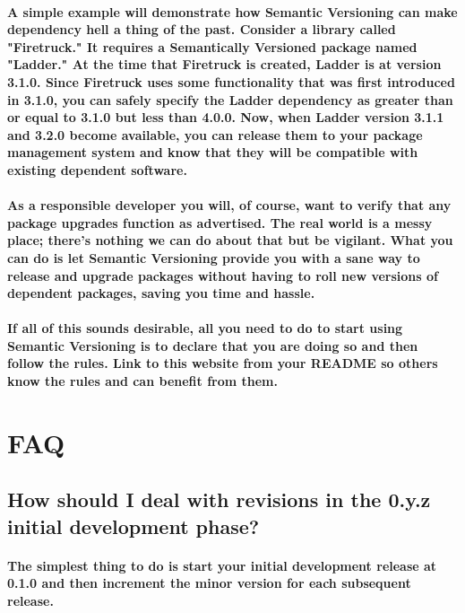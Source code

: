 \paragraph{
A simple example will demonstrate how Semantic Versioning can make dependency hell 
a thing of the past. Consider a library called "Firetruck." It requires a Semantically 
Versioned package named "Ladder." At the time that Firetruck is created, Ladder is 
at version 3.1.0. Since Firetruck uses some functionality that was first introduced 
in 3.1.0, you can safely specify the Ladder dependency as greater than or equal to 
3.1.0 but less than 4.0.0. Now, when Ladder version 3.1.1 and 3.2.0 become available, 
you can release them to your package management system and know that they will be 
compatible with existing dependent software.
}

\paragraph{
As a responsible developer you will, of course, want to verify that any package 
upgrades function as advertised. The real world is a messy place; there's nothing 
we can do about that but be vigilant. What you can do is let Semantic Versioning 
provide you with a sane way to release and upgrade packages without having to 
roll new versions of dependent packages, saving you time and hassle.
}

\paragraph{
If all of this sounds desirable, all you need to do to start using Semantic 
Versioning is to declare that you are doing so and then follow the rules. 
Link to this website from your README so others know the rules and can benefit from them.
}

\section{FAQ}

\subsection{ How should I deal with revisions in the 0.y.z initial development phase? }

\paragraph{
The simplest thing to do is start your initial development release at 0.1.0 and then 
increment the minor version for each subsequent release.
}

